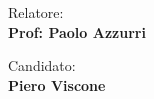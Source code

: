 \begin{titlepage}
\begin{center}
\end{center}
\vspace{30mm}

\begin{minipage}[t]{0.47\textwidth}
	{\large{Relatore:}{\normalsize\vspace{3mm}
	\\ \large{\textbf{Prof: Paolo Azzurri}} \normalsize}}
\end{minipage}
\hfill
\begin{minipage}[t]{0.47\textwidth}\raggedleft
	{\large{Candidato:}{\normalsize\vspace{3mm} \\ \large{\textbf{Piero Viscone}}}}
\end{minipage}

\vspace{30mm}
\hrulefill
\\




\end{titlepage}
\restoregeometry
